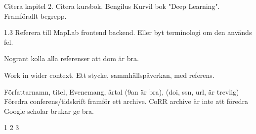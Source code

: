 

Citera kapitel 2. Citera kursbok. Bengilus Kurvil bok "Deep Learning".
Framförallt begrepp.

1.3 Referera till MapLab frontend backend. Eller byt terminologi om den används fel.

Nogrant kolla alla referenser att dom är bra.

Work in wider context. Ett stycke, sammhällspåverkan, med referens.

Författarnamn, titel, Evenemang, årtal (9an är bra), (doi, ssn, url, är trevlig)
Föredra conferens/tidskrift framför ett archive.
CoRR archive är inte att föredra
Google scholar brukar ge bra.



1
2
3
